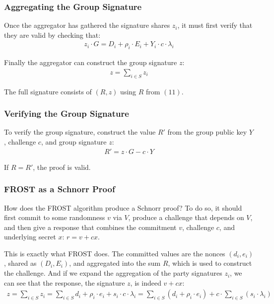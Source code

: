 \documentclass{article}
\begin{document}
\subsubsection{
  Aggregating the Group Signature
}

Once the aggregator has gathered the signature shares $z_i$, it must first verify that they are valid by checking that:
\begin{align}
  z_i \cdot G = D_i + \rho_i \cdot E_i + Y_i \cdot c \cdot \lambda_i
\end{align}

Finally the aggregator can construct the group signature $z$:
\begin{align}
  z = \sum_{i \in S}^{} z_i
\end{align}

The full signature consists of $(R, z)$ using $R$ from $(11)$.

\subsubsection{
  Verifying the Group Signature
}

To verify the group signature, construct the value $R'$ from the group public key $Y$, challenge $c$, and group signature $z$:
\begin{align}
  R' = z \cdot G - c \cdot Y
\end{align}

If $R = R'$, the proof is valid.

\subsubsection{
  FROST as a Schnorr Proof
}

How does the FROST algorithm produce a Schnorr proof?  To do so, it should first commit to some randomness $v$ via $V$, produce a challenge that depends on $V$, and then give a response that combines the commitment $v$, challenge $c$, and underlying secret $x$: $r = v + cx$.

This is exactly what FROST does.  The committed values are the nonces $(d_i, e_i)$, shared as $(D_i, E_i)$, and aggregated into the sum $R$, which is used to construct the challenge.  And if we expand the aggregation of the party signatures $z_i$, we can see that the response, the signature $z$, is indeed $v + cx$:
\begin{align}
  z = \sum_{i \in S}^{} z_i = \sum_{i \in S}^{} d_i + \rho_i \cdot e_i + s_i \cdot c \cdot \lambda_i = \sum_{i \in S}^{} (d_i + \rho_i \cdot e_i) + c \cdot \sum_{i \in S}^{}(s_i \cdot \lambda_i)\nonumber
\end{align}
\end{document}
